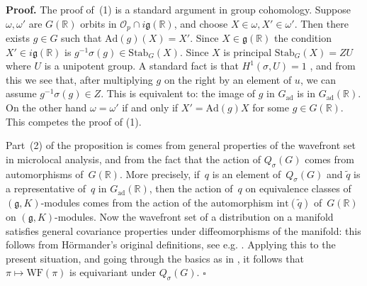\documentclass[10pt,leqno]{article}
\newcommand{\qed}{\hfill $\square$ \medskip}
\newenvironment{proof}[1][Proof]{\noindent\textbf{#1.} }{\qed}
\newcommand{\Ad}{\mathrm{Ad}}
\newcommand{\Gad}{G_\mathrm{ad}}
\newcommand{\Stab}{\mathrm{Stab}}
\renewcommand{\O}{\mathcal O}
\newcommand{\R}{\mathbb R}
\newcommand{\g}{\mathfrak g}
\newcommand\inv{^{-1}}
\newcommand{\WF}{\mathrm{WF}}
\newcommand{\Op}{\O_p}
\begin{document}
\begin{proof}
The proof of~(1) is a standard argument in group cohomology. Suppose $\omega,\omega'$ are $G(\R)$ orbits in $\Op\cap i\g(\R)$,
and choose $X\in \omega,X'\in\omega'$. Then there exists $g\in G$ such that $\Ad(g)(X)=X'$. Since $X\in \g(\R)$ the condition $X'\in i\g(\R)$ 
is $g\inv \sigma(g)\in \Stab_G(X)$.  Since $X$ is principal $\Stab_G(X)=ZU$ where $U$ is a unipotent group. 
A standard fact is that $H^1(\sigma, U)=1$ \cite[Chap.~III, Proposition~6]{Serre_Galois}, and from this we see that, after multiplying $g$ on the right by an element of $u$, we can assume $g\inv \sigma(g)\in Z$. This is equivalent to: the image of $g$ in $\Gad$ is in $\Gad(\R)$. On the other hand $\omega=\omega'$ 
if and only if $X'=\Ad(g)X$ for some $g\in G(\R)$. This competes the proof of (1).

Part~(2) of the proposition is comes from general properties of the wavefront set in microlocal analysis, and from the fact that the action of $Q_{\sigma}(G)$ comes from automorphisms of~$G(\R)$. More precisely, if~$q$ is an element of~$Q_{\sigma}(G)$ and $\tilde{q}$ is a representative of~$q$ in $\Gad(\R)$, then the action of~$q$ on equivalence classes of $(\g, K)$-modules comes from the action of the automorphism $\mathrm{int}(\tilde{q})$ of~$G(\R)$ on $(\g, K)$-modules. Now the wavefront set of a distribution on a manifold satisfies general covariance properties under diffeomorphisms of the manifold: this follows from Hörmander's original definitions, see e.g. \cite[Section 2, p.~800]{HarrisHeOlafsson}. Applying this to the present situation, and going through the basics as in   \cite[Section~2]{HarrisHeOlafsson}, it follows that $\pi \mapsto \WF(\pi)$ is equivariant under $Q_{\sigma}(G)$.
\end{proof}
\end{document}
